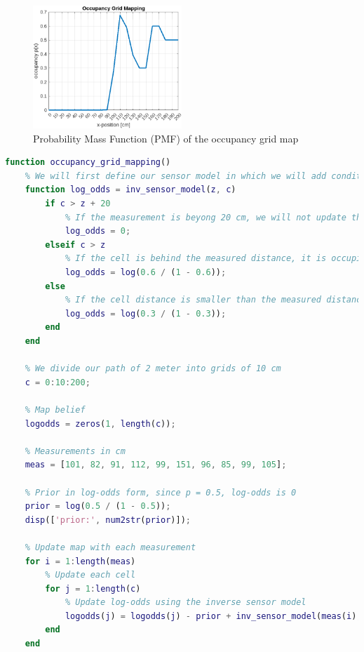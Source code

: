 \documentclass[answers]{exam}
\begin{document}
\begin{questions}
    \begin{solution}
        \begin{figure}[H] %
            \centering
            \includegraphics[width=0.5\textwidth]{Q2PMF.png} %
            \caption{Probability Mass Function (PMF) of the occupancy grid map}
            \label{fig:image1} %
        \end{figure}

        \begin{lstlisting}[language=Matlab, caption=Occupancy Grid Mapping, label={lst:code}]
function occupancy_grid_mapping()
    % We will first define our sensor model in which we will add conditions depending on the distane of the cell from the robot
    function log_odds = inv_sensor_model(z, c)
        if c > z + 20
            % If the measurement is beyong 20 cm, we will not update the cell as per the instructions
            log_odds = 0;
        elseif c > z
            % If the cell is behind the measured distance, it is occupied with probability 0.6
            log_odds = log(0.6 / (1 - 0.6));
        else
            % If the cell distance is smaller than the measured distance, it is occupied with probability 0.3
            log_odds = log(0.3 / (1 - 0.3));
        end
    end

    % We divide our path of 2 meter into grids of 10 cm
    c = 0:10:200;

    % Map belief
    logodds = zeros(1, length(c));

    % Measurements in cm
    meas = [101, 82, 91, 112, 99, 151, 96, 85, 99, 105];

    % Prior in log-odds form, since p = 0.5, log-odds is 0
    prior = log(0.5 / (1 - 0.5));
    disp(['prior:', num2str(prior)]);

    % Update map with each measurement
    for i = 1:length(meas)
        % Update each cell
        for j = 1:length(c)
            % Update log-odds using the inverse sensor model
            logodds(j) = logodds(j) - prior + inv_sensor_model(meas(i), c(j));
        end
    end


\end{lstlisting}
\end{solution}
\end{questions}
\end{document}
